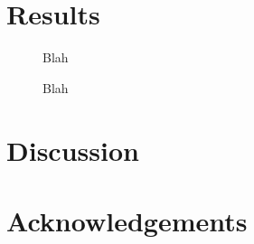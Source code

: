 \documentclass[reprint,amsmath,amssymb,aps,twoside]{revtex4-2}
\begin{document}
\section{Results}
\begin{figure*}

\caption{Blah}
\end{figure*}

\begin{figure*}

\caption{Blah}
\end{figure*}
\section{Discussion}
\section{Acknowledgements}

\end{document}
